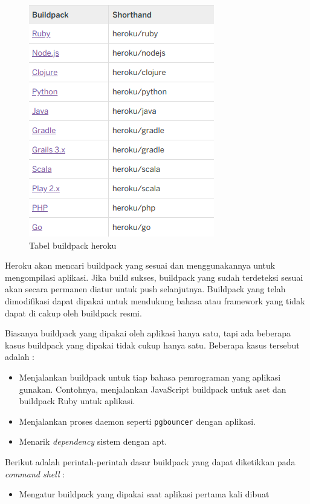 \documentclass[a4paper,twoside]{article}
\begin{document}
\begin{enumerate}
\begin{enumerate}
\begin{itemize}
\begin{figure}[H]
	\centering  
	\includegraphics[scale=0.5]{Gambar/heroku-buildpack-table.png}  
	\caption[Tabel buildpack heroku]{Tabel buildpack heroku} 
	\label{fig:heroku-buildpack-table} 
\end{figure}

Heroku akan mencari buildpack yang sesuai dan menggunakannya untuk mengompilasi aplikasi. Jika build sukses, buildpack yang sudah terdeteksi sesuai akan secara permanen diatur untuk push selanjutnya. Buildpack yang telah dimodifikasi dapat dipakai untuk mendukung bahasa atau framework yang tidak dapat di cakup oleh buildpack resmi.

Biasanya buildpack yang dipakai oleh aplikasi hanya satu, tapi ada beberapa kasus buildpack yang dipakai tidak cukup hanya satu. Beberapa kasus tersebut adalah :
\begin{itemize}
\item Menjalankan buildpack untuk tiap bahasa pemrograman yang aplikasi gunakan. Contohnya, menjalankan JavaScript buildpack untuk aset dan buildpack Ruby untuk aplikasi.
\item Menjalankan proses daemon seperti \texttt{pgbouncer} dengan aplikasi.
\item Menarik \textit{dependency} sistem dengan apt.
\end{itemize}

Berikut adalah perintah-perintah dasar buildpack yang dapat diketikkan pada \textit{command shell} :
\begin{itemize}
\item Mengatur buildpack yang dipakai saat aplikasi pertama kali dibuat
\begin{lstlisting}


\end{lstlisting}
\end{itemize}
\end{itemize}
\end{enumerate}
\end{enumerate}
\end{document}
